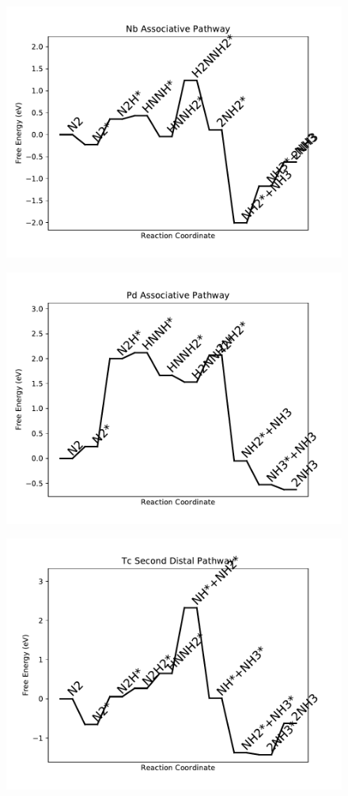\begin{figure}
\includegraphics[width=0.8\linewidth]{data/plots/Nb_associative.pdf}
\label{fig:Nb_associative}
\end{figure}

\begin{figure}
\includegraphics[width=0.8\linewidth]{data/plots/Pd_associative.pdf}
\label{fig:Pd_associative}
\end{figure}

\begin{figure}
\includegraphics[width=0.8\linewidth]{data/plots/Tc_distal_2.pdf}
\label{fig:Tc_distal_2}
\end{figure}


